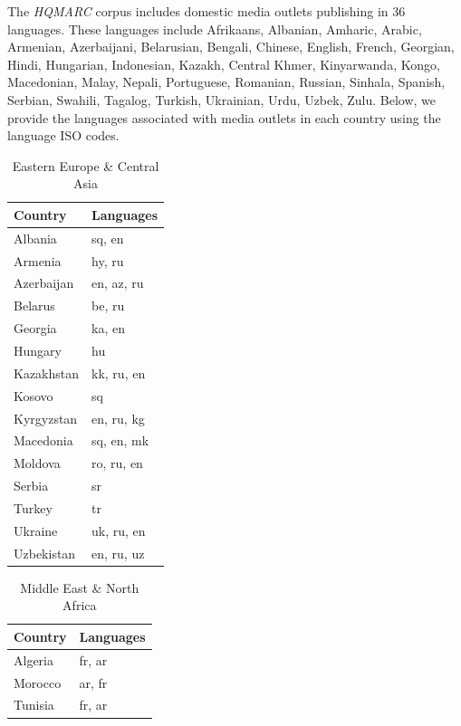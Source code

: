 \documentclass[
  letterpaper,
  DIV=11,
  numbers=noendperiod]{scrartcl}
\begin{document}
The \emph{HQMARC} corpus includes domestic media outlets publishing in
36 languages. These languages include Afrikaans, Albanian, Amharic,
Arabic, Armenian, Azerbaijani, Belarusian, Bengali, Chinese, English,
French, Georgian, Hindi, Hungarian, Indonesian, Kazakh, Central Khmer,
Kinyarwanda, Kongo, Macedonian, Malay, Nepali, Portuguese, Romanian,
Russian, Sinhala, Spanish, Serbian, Swahili, Tagalog, Turkish,
Ukrainian, Urdu, Uzbek, Zulu. Below, we provide the languages associated
with media outlets in each country using the language ISO codes.

\begin{table}[!h]
\centering
\caption{Eastern Europe \& Central Asia}
\centering
\fontsize{10}{12}\selectfont
\begin{tabular}[t]{l|l}
\hline
Country & Languages\\
\hline
Albania & sq, en\\
Armenia & hy, ru\\
Azerbaijan & en, az, ru\\
Belarus & be, ru\\
Georgia & ka, en\\
Hungary & hu\\
Kazakhstan & kk, ru, en\\
Kosovo & sq\\
Kyrgyzstan & en, ru, kg\\
Macedonia & sq, en, mk\\
Moldova & ro, ru, en\\
Serbia & sr\\
Turkey & tr\\
Ukraine & uk, ru, en\\
Uzbekistan & en, ru, uz\\
\hline
\end{tabular}
\end{table}

\begin{table}[!h]
\centering
\caption{Middle East \& North Africa}
\centering
\fontsize{10}{12}\selectfont
\begin{tabular}[t]{l|l}
\hline
Country & Languages\\
\hline
Algeria & fr, ar\\
Morocco & ar, fr\\
Tunisia & fr, ar\\
\hline
\end{tabular}
\end{table}
\end{document}
